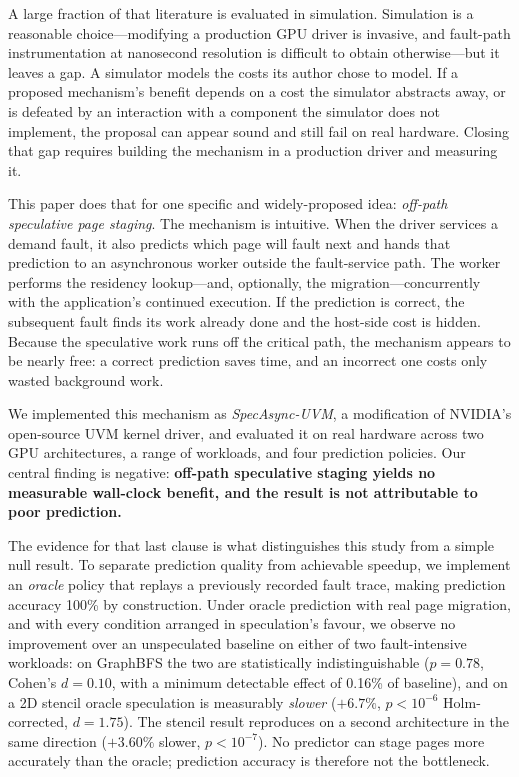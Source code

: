 A large fraction of that literature is evaluated in simulation. Simulation is a
reasonable choice---modifying a production GPU driver is invasive, and
fault-path instrumentation at nanosecond resolution is difficult to obtain
otherwise---but it leaves a gap. A simulator models the costs its author chose
to model. If a proposed mechanism's benefit depends on a cost the simulator
abstracts away, or is defeated by an interaction with a component the simulator
does not implement, the proposal can appear sound and still fail on real
hardware. Closing that gap requires building the mechanism in a production
driver and measuring it.

This paper does that for one specific and widely-proposed idea: \emph{off-path
speculative page staging}. The mechanism is intuitive. When the driver services
a demand fault, it also predicts which page will fault next and hands that
prediction to an asynchronous worker outside the fault-service path. The worker
performs the residency lookup---and, optionally, the migration---concurrently
with the application's continued execution. If the prediction is correct, the
subsequent fault finds its work already done and the host-side cost is hidden.
Because the speculative work runs off the critical path, the mechanism appears
to be nearly free: a correct prediction saves time, and an incorrect one costs
only wasted background work.

We implemented this mechanism as \emph{SpecAsync-UVM}, a modification of
NVIDIA's open-source UVM kernel driver, and evaluated it on real hardware across
two GPU architectures, a range of workloads, and four prediction policies. Our
central finding is negative: \textbf{off-path speculative staging yields no
measurable wall-clock benefit, and the result is not attributable to poor
prediction.}

The evidence for that last clause is what distinguishes this study from a simple
null result. To separate prediction quality from achievable speedup, we
implement an \emph{oracle} policy that replays a previously recorded fault
trace, making prediction accuracy 100\% by construction. Under oracle prediction
with real page migration, and with every condition arranged in speculation's
favour, we observe no improvement over an unspeculated baseline on either of two
fault-intensive workloads: on GraphBFS the two are statistically
indistinguishable ($p=0.78$, Cohen's $d=0.10$, with a minimum detectable effect
of 0.16\% of baseline), and on a 2D stencil oracle speculation is measurably
\emph{slower} ($+6.7\%$, $p<10^{-6}$ Holm-corrected, $d=1.75$). The stencil
result reproduces on a second architecture in the same direction ($+3.60\%$
slower, $p<10^{-7}$). No predictor can stage pages more accurately than the
oracle; prediction accuracy is therefore not the bottleneck.

